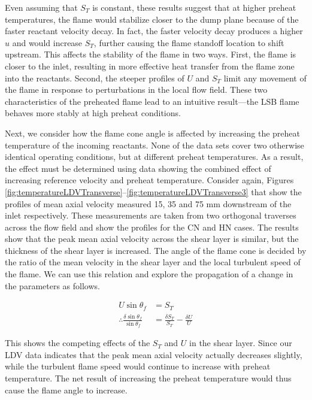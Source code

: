 Even assuming that \(S_T\) is constant, these results suggest that at higher preheat temperatures, the flame would stabilize closer to the dump plane because of the faster reactant velocity decay.
In fact, the faster velocity decay produces a higher \(u\) and would increase \(S_T\), further causing the flame standoff location to shift upstream.
This affects the stability of the flame in two ways.
First, the flame is closer to the inlet, resulting in more effective heat transfer from the flame zone into the reactants.
Second, the steeper profiles of \(U\) and \(S_T\) limit any movement of the flame in response to perturbations in the local flow field.
These two characteristics of the preheated flame lead to an intuitive result---the LSB flame behaves more stably at high preheat conditions.

Next, we consider how the flame cone angle is affected by increasing the preheat temperature of the incoming reactants.
None of the data sets cover two otherwise identical operating conditions, but at different preheat temperatures.
As a result, the effect must be determined using data showing the combined effect of increasing reference velocity and preheat temperature.
Consider again, Figures \ref{fig:temperatureLDVTransverse}--\ref{fig:temperatureLDVTransverse3} that show the profiles of mean axial velocity measured 15, 35 and 75 mm downstream of the inlet respectively.
These measurements are taken from two orthogonal traverses across the flow field and show the profiles for the CN and HN cases.
The results show that the peak mean axial velocity across the shear layer is similar, but the thickness of the shear layer is increased.
The angle of the flame cone is decided by the ratio of the mean velocity in the shear layer and the local turbulent speed of the flame.
We can use this relation and explore the propagation of a change in the parameters as follows.

\begin{align}
  U \sin \theta_f &= S_T \nonumber \\
  \therefore \frac{ \delta \sin \theta_f }{ \sin \theta_f } &= \frac{ \delta S_T }{ S_T } - \frac{ \delta U }{ U }
\end{align}

This shows the competing effects of the \(S_T\) and \(U\) in the shear layer.
Since our LDV data indicates that the peak mean axial velocity actually decreases slightly, while the turbulent flame speed would continue to increase with preheat temperature.
The net result of increasing the preheat temperature would thus cause the flame angle to increase.

